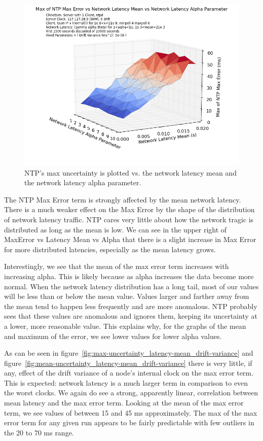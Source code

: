 \begin{figure}[h]
  \caption{NTP's max uncertainty is plotted vs. the network latency mean and the network latency alpha parameter.}
  \label{fig:max-uncertainty_latency-mean_latency-alpha}
  \includegraphics[width=0.8\linewidth]{max_error-latency_mean-latency_alpha.png}
\end{figure}

The NTP Max Error term is strongly affected by the mean network
latency. There is a much weaker effect on the Max Error by the shape
of the distribution of network latency traffic. NTP cares very little
about how the network tragic is distributed as long as the mean is
low. We can see in the upper right of MaxError vs Latency Mean vs
Alpha that there is a slight increase in Max Error for more
distributed latencies, especially as the mean latency grows.

Interestingly, we see that the mean of the max error term increases
with increasing alpha. This is likely because as alpha increases the
data become more normal. When the network latency distribution has a
long tail, most of our values will be less than or below the mean
value. Values larger and farther away from the mean tend to happen
less frequently and are more anomalous. NTP probably sees that these
values are anomalous and ignores them, keeping its uncertainty at a
lower, more reasonable value. This explains why, for the graphs of the
mean and maximum of the error, we see lower values for lower alpha
values.

As can be seen in figure~\ref{fig:max-uncertainty_latency-mean_drift-variance} and 
figure~\ref{fig:mean-uncertainty_latency-mean_drift-variance} there is very little, if any,
effect of the drift variance of a node's internal clock on the max
error term. This is expected: network latency is a much larger term in
comparison to even the worst clocks. We again do see a strong,
apparently linear, correlation between mean latency and the max error
term. Looking at the mean of the max error term, we see values of
between 15 and 45 ms approximately. The max of the max error term for
any given run appears to be fairly predictable with few outliers in
the 20 to 70 ms range. 

